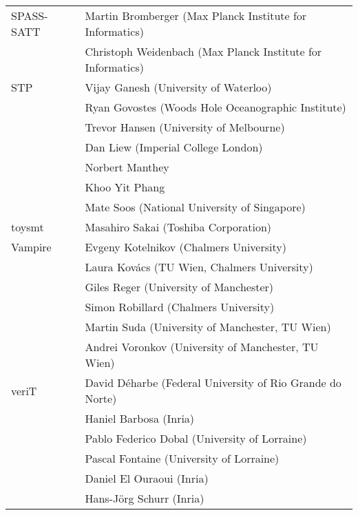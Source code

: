 {\begin{table}
\begin{tabular}{ll}
      SPASS-SATT
      & Martin Bromberger (Max Planck Institute for Informatics) \\
      & Christoph Weidenbach (Max Planck Institute for Informatics)
      \\ \midrule

      STP~\cite{ganesh07}
      & Vijay Ganesh (University of Waterloo) \\
      & Ryan Govostes (Woods Hole Oceanographic Institute) \\
      & Trevor Hansen (University of Melbourne) \\
      & Dan Liew (Imperial College London) \\
      & Norbert Manthey \\
      & Khoo Yit Phang \\
      & Mate Soos (National University of Singapore)
      \\ \midrule

      toysmt
      & Masahiro Sakai (Toshiba Corporation)
      \\ \midrule

      Vampire~\cite{DBLP:conf/cav/KovacsV13}
      & Evgeny Kotelnikov (Chalmers University) \\
      & Laura Kov\'acs (TU Wien, Chalmers University) \\
      & Giles Reger (University of Manchester) \\
      & Simon Robillard (Chalmers University) \\
      & Martin Suda (University of Manchester, TU Wien) \\
      & Andrei Voronkov (University of Manchester, TU Wien)
      \\ \midrule

      veriT~\cite{DBLP:conf/cade/BoutonODF09}
      & David D\'eharbe (Federal University of Rio Grande do Norte) \\
      & Haniel Barbosa (Inria) \\
      & Pablo Federico Dobal (University of Lorraine) \\
      & Pascal Fontaine (University of Lorraine) \\
      & Daniel El Ouraoui (Inria) \\
      & Hans-J\"org Schurr (Inria)
      \\ \midrule



\end{tabular}
\end{table}}
